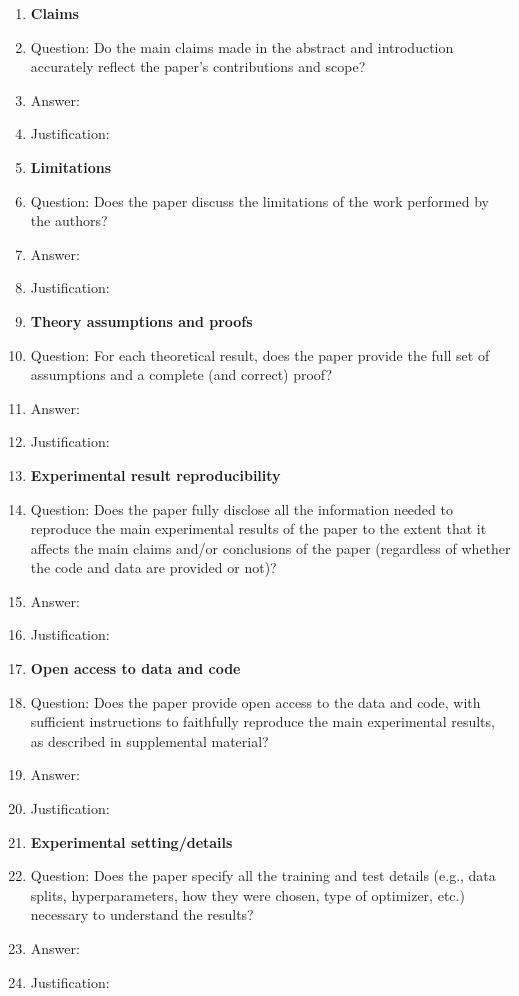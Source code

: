 \documentclass{article}
\begin{document}
\begin{enumerate}

\item {\bf Claims}
    \item[] Question: Do the main claims made in the abstract and introduction accurately reflect the paper's contributions and scope?
    \item[] Answer: \answerTODO{}
    \item[] Justification: \justificationTODO{}

\item {\bf Limitations}
    \item[] Question: Does the paper discuss the limitations of the work performed by the authors?
    \item[] Answer: \answerTODO{}
    \item[] Justification: \justificationTODO{}

\item {\bf Theory assumptions and proofs}
    \item[] Question: For each theoretical result, does the paper provide the full set of assumptions and a complete (and correct) proof?
    \item[] Answer: \answerTODO{}
    \item[] Justification: \justificationTODO{}

\item {\bf Experimental result reproducibility}
    \item[] Question: Does the paper fully disclose all the information needed to reproduce the main experimental results of the paper to the extent that it affects the main claims and/or conclusions of the paper (regardless of whether the code and data are provided or not)?
    \item[] Answer: \answerTODO{}
    \item[] Justification: \justificationTODO{}

\item {\bf Open access to data and code}
    \item[] Question: Does the paper provide open access to the data and code, with sufficient instructions to faithfully reproduce the main experimental results, as described in supplemental material?
    \item[] Answer: \answerTODO{}
    \item[] Justification: \justificationTODO{}

\item {\bf Experimental setting/details}
    \item[] Question: Does the paper specify all the training and test details (e.g., data splits, hyperparameters, how they were chosen, type of optimizer, etc.) necessary to understand the results?
    \item[] Answer: \answerTODO{}
    \item[] Justification: \justificationTODO{}


\end{enumerate}
\end{document}

